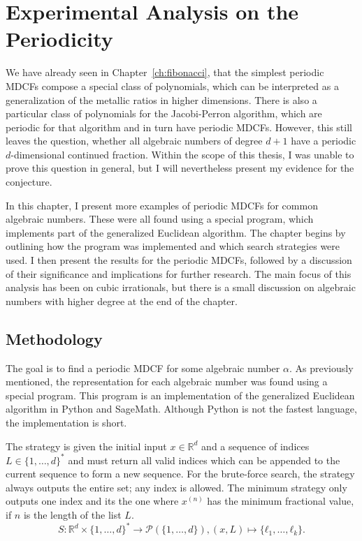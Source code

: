 \chapter{Experimental Analysis on the Periodicity}
\label{ch:implementation}

We have already seen in Chapter~\ref{ch:fibonacci},
that the simplest periodic MDCFs compose a special class of polynomials,
which can be interpreted as a generalization of the metallic ratios in higher
dimensions.
There is also a particular class of polynomials for the Jacobi-Perron algorithm,
which are periodic for that algorithm and in turn have periodic MDCFs.
However, this still leaves the question, whether all algebraic numbers of degree $d+1$
have a periodic $d$-dimensional continued fraction.
Within the scope of this thesis, I was unable to prove this question in
general, but I will nevertheless present my evidence for the conjecture.

In this chapter, I present more examples of periodic MDCFs for common algebraic numbers.
These were all found using a special program, which implements part of the generalized Euclidean algorithm.
The chapter begins by outlining how the program was implemented and which search strategies were used.
I then present the results for the periodic MDCFs, followed by a discussion of
their significance and implications for further research.
The main focus of this analysis has been on cubic irrationals,
but there is a small discussion on algebraic numbers with higher degree at the end of the chapter.

\section{Methodology}

The goal is to find a periodic MDCF for some algebraic number $α$.
As previously mentioned, the representation for each algebraic number was found
using a special program.
This program is an implementation of the generalized Euclidean algorithm
in Python and SageMath.
Although Python is not the fastest language, the implementation is short.

The strategy is given the initial input $x ∈ ℝ^d$ and a sequence of indices $L ∈ \{1, …, d\}^*$ and must
return all valid indices which can be appended to the current sequence to form
a new sequence.
For the brute-force search, the strategy always outputs the entire set; any index is allowed.
The minimum strategy only outputs one index and its the one where $x^{(n)}$ has
the minimum fractional value, if $n$ is the length of the list $L$.
\[
  S \colon ℝ^d × \{1, …, d\}^* → \mathcal P(\{1, …, d\}), (x, L) ↦ \{ℓ_1, …, ℓ_k\}.
\]

